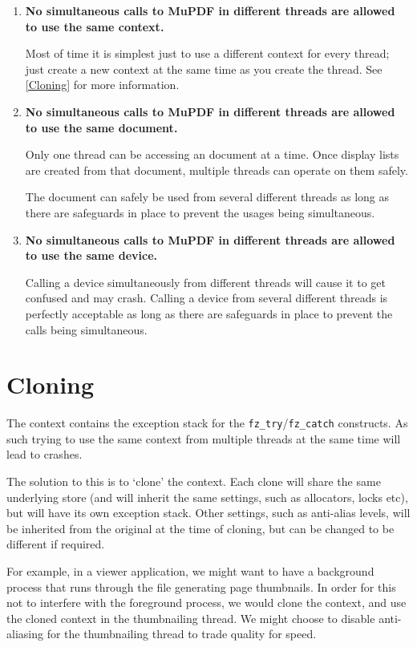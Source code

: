 \documentclass[oneside]{book}
\newcommand{\rjwref}[1] {\autoref{#1} \nameref{#1}}
\begin{document}
\begin{enumerate}
\item \textbf{No simultaneous calls to MuPDF in different threads are allowed to use the same context.}

Most of time it is simplest just to use a different context for every thread; just create a new context at the same time as you create the thread. See \rjwref{Cloning} for more information.

\item \textbf{No simultaneous calls to MuPDF in different threads are allowed to use the same document.}

Only one thread can be accessing an document at a time. Once display lists are created from that document, multiple threads can operate on them safely.

The document can safely be used from several different threads as long as there are safeguards in place to prevent the usages being simultaneous.

\item \textbf{No simultaneous calls to MuPDF in different threads are allowed to use the same device.}

Calling a device simultaneously from different threads will cause it to get confused and may crash. Calling a device from several different threads is perfectly acceptable as long as there are safeguards in place to prevent the calls being simultaneous.

\end{enumerate}


\section{Cloning}
\label{Cloning}

The context contains the exception stack for the \texttt{fz\_try}\slash\texttt{fz\_catch} constructs. As such trying to use the same context from multiple threads at the same time will lead to crashes.

The solution to this is to `clone' the context. Each clone will share the same underlying store (and will inherit the same settings, such as allocators, locks etc), but will have its own exception stack. Other settings, such as anti-alias levels, will be inherited from the original at the time of cloning, but can be changed to be different if required.

For example, in a viewer application, we might want to have a background process that runs through the file generating page thumbnails. In order for this not to interfere with the foreground process, we would clone the context, and use the cloned context in the thumbnailing thread. We might choose to disable anti-aliasing for the thumbnailing thread to trade quality for speed.
\end{document}
